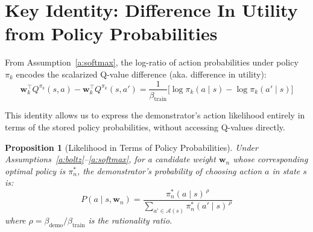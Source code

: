 \documentclass[11pt]{article}
\newtheorem{proposition}{Proposition}
\begin{document}
\section{Key Identity: Difference In Utility from Policy Probabilities}

From Assumption~\ref{a:softmax}, the log-ratio of action probabilities under policy $\pi_k$ encodes the scalarized Q-value difference (aka. difference in utility):
\begin{equation}
\label{eq:key_identity}
    \mathbf{w}_k^\top Q^{\pi_k}(s, a) - \mathbf{w}_k^\top Q^{\pi_k}(s, a') = \frac{1}{\beta_{\text{train}}} \Big[\log \pi_k(a \mid s) - \log \pi_k(a' \mid s)\Big]
\end{equation}

This identity allows us to express the demonstrator's action likelihood entirely in terms of the stored policy probabilities, without accessing Q-values directly.


\begin{proposition}[Likelihood in Terms of Policy Probabilities]
\label{prop:likelihood}
Under Assumptions~\ref{a:boltz}--\ref{a:softmax}, for a candidate weight $\mathbf{w}_n$ whose corresponding optimal policy is $\pi_n^*$, the demonstrator's probability of choosing action $a$ in state $s$ is:
\begin{equation}
\label{eq:likelihood}
    P(a \mid s, \mathbf{w}_n) = \frac{\pi_n^*(a \mid s)^{\,\rho}}{\displaystyle\sum_{a' \in \mathcal{A}(s)} \pi_n^*(a' \mid s)^{\,\rho}}
\end{equation}
where $\rho = \beta_{\text{demo}} / \beta_{\text{train}}$ is the rationality ratio.
\end{proposition}
\end{document}
